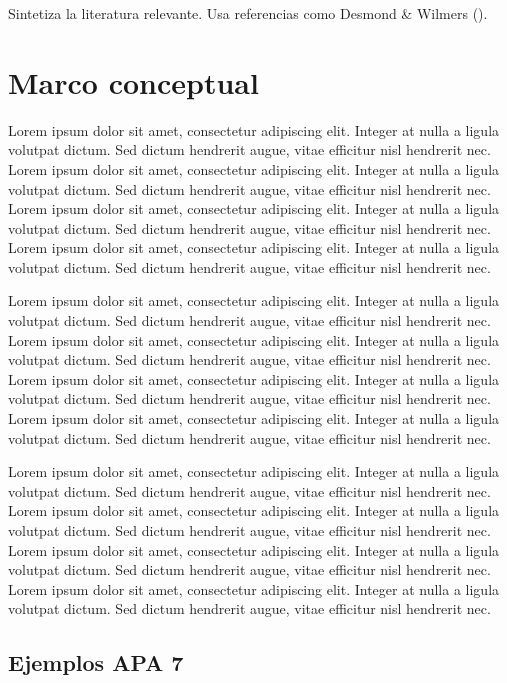 \documentclass[
  spanish,
  a4paper,
  oneside]{scrbook}
\begin{document}
Sintetiza la literatura relevante. Usa referencias como Desmond \&
Wilmers ().

\section{Marco conceptual}\label{marco-conceptual}

Lorem ipsum dolor sit amet, consectetur adipiscing elit. Integer at
nulla a ligula volutpat dictum. Sed dictum hendrerit augue, vitae
efficitur nisl hendrerit nec. Lorem ipsum dolor sit amet, consectetur
adipiscing elit. Integer at nulla a ligula volutpat dictum. Sed dictum
hendrerit augue, vitae efficitur nisl hendrerit nec. Lorem ipsum dolor
sit amet, consectetur adipiscing elit. Integer at nulla a ligula
volutpat dictum. Sed dictum hendrerit augue, vitae efficitur nisl
hendrerit nec. Lorem ipsum dolor sit amet, consectetur adipiscing elit.
Integer at nulla a ligula volutpat dictum. Sed dictum hendrerit augue,
vitae efficitur nisl hendrerit nec.

Lorem ipsum dolor sit amet, consectetur adipiscing elit. Integer at
nulla a ligula volutpat dictum. Sed dictum hendrerit augue, vitae
efficitur nisl hendrerit nec. Lorem ipsum dolor sit amet, consectetur
adipiscing elit. Integer at nulla a ligula volutpat dictum. Sed dictum
hendrerit augue, vitae efficitur nisl hendrerit nec. Lorem ipsum dolor
sit amet, consectetur adipiscing elit. Integer at nulla a ligula
volutpat dictum. Sed dictum hendrerit augue, vitae efficitur nisl
hendrerit nec. Lorem ipsum dolor sit amet, consectetur adipiscing elit.
Integer at nulla a ligula volutpat dictum. Sed dictum hendrerit augue,
vitae efficitur nisl hendrerit nec.

Lorem ipsum dolor sit amet, consectetur adipiscing elit. Integer at
nulla a ligula volutpat dictum. Sed dictum hendrerit augue, vitae
efficitur nisl hendrerit nec. Lorem ipsum dolor sit amet, consectetur
adipiscing elit. Integer at nulla a ligula volutpat dictum. Sed dictum
hendrerit augue, vitae efficitur nisl hendrerit nec. Lorem ipsum dolor
sit amet, consectetur adipiscing elit. Integer at nulla a ligula
volutpat dictum. Sed dictum hendrerit augue, vitae efficitur nisl
hendrerit nec. Lorem ipsum dolor sit amet, consectetur adipiscing elit.
Integer at nulla a ligula volutpat dictum. Sed dictum hendrerit augue,
vitae efficitur nisl hendrerit nec.

\subsection{Ejemplos APA 7}\label{ejemplos-apa-7}
\end{document}
